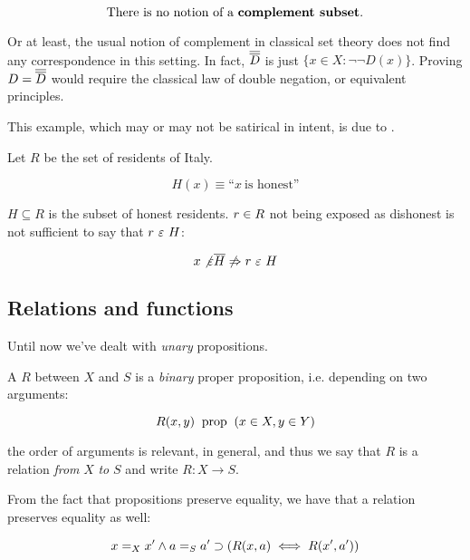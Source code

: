 \[ \text{There is no notion of a}\ \strong{complement subset}.\]

Or at least, the usual notion of complement in classical set theory does not
find any correspondence in this setting. In fact, \(\overline{\overline{D}}\) is
just \(\{ x \in X : \neg\neg D(x) \}\). Proving $D = \overline{\overline{D}}$
would require the classical law of double negation, or equivalent principles.

\begin{example}
  This example, which may or may not be satirical in intent, is due to
  \cite{basicpicture}.

  Let \(R\) be the set of residents of Italy.
  
  \[ H(x) \equiv \text{``}x\ \text{is honest''} \]
  
  \(H \subseteq R\) is the subset of honest residents.
  \(r \in R\) not being exposed as dishonest is not sufficient to say that
  \(r\ \varepsilon\ H\):
  
  \[ x \not\varepsilon \overline{H} \not\Rightarrow r\ \varepsilon\ H \]
\end{example}

\subsection{Relations and functions}
Until now we've dealt with \emph{unary} propositions.

\begin{definition}[Relation]
  A  $R$ between $X$ and $S$ is a \emph{binary} proper
  proposition, i.e. depending on two arguments:

  \[ R(x, y) \; \; \text{prop}\; \; (x \in X, y \in Y) \]
\end{definition}

the order of arguments is relevant, in general, and thus we say that
$R$ is a relation \emph{from} $X$ \emph{to} $S$ and write
$R : X \rightarrow S$.

From the fact that propositions preserve equality, we have that a relation
preserves equality as well:

\[
  \implconn{
    \andconn{x =_X x'}{a =_S a'}
  }{
    (R(x, a) \iff R(x' , a'))
  }
\]

